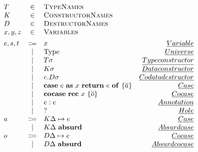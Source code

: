 \[
\begin{array}{lclr}
    T &\in &\textsc{TypeNames} & \\
    K &\in &\textsc{ConstructorNames} & \\
    D &\in &\textsc{DestructorNames} & \\
    x,y,z &\in &\textsc{Variables} & \\[0.15cm]
    e,s,t &\Coloneqq & x & \emph{Variable} \\
    & \mid & \text{Type} & \emph{Universe} \\
    & \mid & T\sigma & \emph{Type constructor} \\
    & \mid & K\sigma & \emph{Data constructor} \\
    & \mid & e.D\sigma & \emph{Codata destructor} \\
    & \mid & \mathbf{case}\ e\ \mathbf{as}\ x\ \mathbf{return}\ e\  \mathbf{of}\ \{ \overline{a} \} & \emph{Case} \\
    & \mid & \mathbf{cocase}\ \mathbf{rec}\ x\ \{ \overline{o} \} & \emph{Cocase} \\
    & \mid & e : e & \emph{Annotation} \\
    & \mid & ? & \emph{Hole} \\
    a & \Coloneqq & K\Delta \mapsto e &\emph{Case} \\
    & \mid & K\Delta\ \mathbf{absurd} &\emph{Absurd case} \\
    o & \Coloneqq & D\Delta \mapsto e &\emph{Cocase} \\
    & \mid & D\Delta\ \mathbf{absurd} & \emph{Absurd cocase} \\
\end{array}
\]